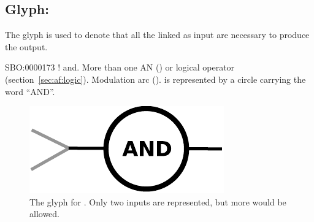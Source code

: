 \subsection{Glyph: }
\label{sec:af:and}

The glyph  is used to denote that all the  linked as input are necessary to produce the output.

\begin{glyphDescription}
 \glyphSboTerm SBO:0000173 ! and.
 \glyphOrigin More than one AN () or logical operator (section~\ref{sec:af:logic}).
 \glyphTarget  Modulation arc ().
 \glyphNode {} is represented by a circle carrying the word ``AND''.
\end{glyphDescription}

\begin{figure}[H]
  \centering
  \includegraphics[scale = 0.5]{images/and}
  \caption{The \AF glyph for . Only two inputs are represented, but more would be allowed.}
  \label{fig:af:and}
\end{figure}
